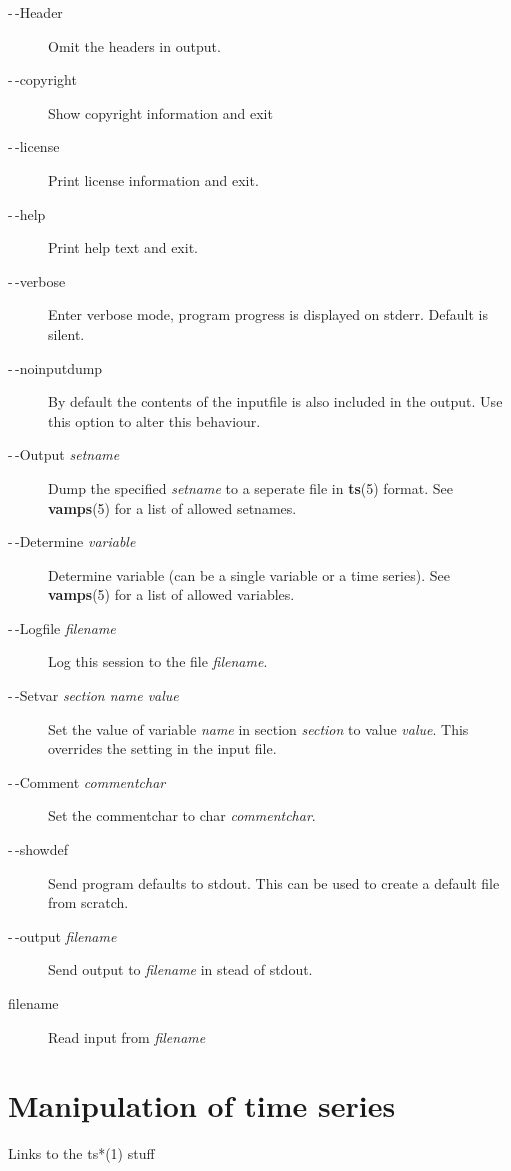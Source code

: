 \begin{description}
\item[-\,-Header]
Omit the headers in output.

\item[-\,-copyright]
Show copyright information and exit

\item[-\,-license]
Print license information and exit.

\item[-\,-help]
Print help text and exit.

\item[-\,-verbose]
Enter verbose mode, program progress is displayed on stderr.
Default is silent.

\item[-\,-noinputdump]
By default the contents of the inputfile is also included in the 
output. Use this option to alter this behaviour.

\item[-\,-Output  {\em setname}]
Dump the specified 
{\em setname}
to a seperate file in
{\bf ts}(5)
format. See
{\bf vamps}(5)
for a list of allowed setnames.

\item[-\,-Determine {\em variable}]
Determine variable (can be a single variable or a time series).
See {\bf vamps}(5)
for a list of allowed variables.

\item[-\,-Logfile {\em filename}]
Log this session to the file {\em filename}.

\item[-\,-Setvar {\em section name value}]
Set the value of variable {\em name}
in section {\em section} to value {\em value}.
This overrides the setting in the input file.

\item[-\,-Comment {\em commentchar}]
Set the commentchar to char {\em commentchar}.

\item[-\,-showdef]
Send program defaults to stdout. This can be used to create a
default file from scratch.


\item[-\,-output {\em filename}]
Send output to {\em filename}
in stead of stdout.

\item[filename]
Read input from {\em filename}
\end{description}

\section{Manipulation of time series}
Links to the ts*(1) stuff

